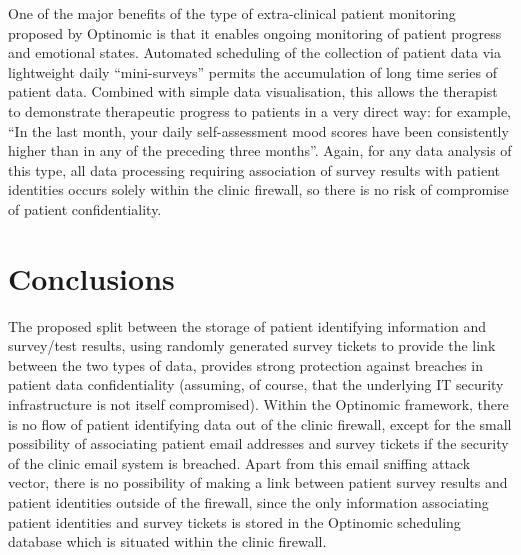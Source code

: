 \documentclass[DIV=calc,paper=a4,fontsize=11pt,twocolumn]{scrartcl}
\begin{document}
One of the major benefits of the type of extra-clinical patient
monitoring proposed by Optinomic is that it enables ongoing monitoring
of patient progress and emotional states.  Automated scheduling of the
collection of patient data via lightweight daily ``mini-surveys''
permits the accumulation of long time series of patient data.
Combined with simple data visualisation, this allows the therapist to
demonstrate therapeutic progress to patients in a very direct way: for
example, ``In the last month, your daily self-assessment mood scores
have been consistently higher than in any of the preceding three
months''.  Again, for any data analysis of this type, all data
processing requiring association of survey results with patient
identities occurs solely within the clinic firewall, so there is no
risk of compromise of patient confidentiality.


\section*{Conclusions}

The proposed split between the storage of patient identifying
information and survey/test results, using randomly generated survey
tickets to provide the link between the two types of data, provides
strong protection against breaches in patient data confidentiality
(assuming, of course, that the underlying IT security infrastructure
is not itself compromised).  Within the Optinomic framework, there is
no flow of patient identifying data out of the clinic firewall, except
for the small possibility of associating patient email addresses and
survey tickets if the security of the clinic email system is breached.
Apart from this email sniffing attack vector, there is no possibility
of making a link between patient survey results and patient identities
outside of the firewall, since the only information associating
patient identities and survey tickets is stored in the Optinomic
scheduling database which is situated within the clinic firewall.
\end{document}
